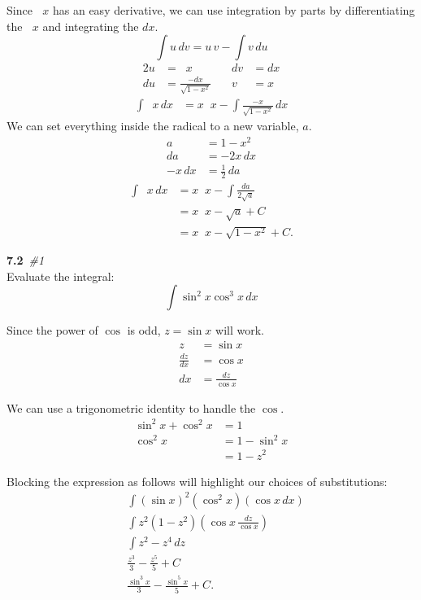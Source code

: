 \documentclass[10pt]{article}
\DeclareMathOperator{\invcos}{cos^{-1}}
\newcommand{\bfit}[2]{\textbf{#1}\ \textit{#2}}
\newcommand{\double}[0]{\par\null\par}
\renewcommand{\section}[2]{\double\LARGE\bfit{#1}{\##2}\normalsize\\}
\newcommand{\paren}[1]{\left({#1}\right)}
\let\xint\int
\renewcommand{\int}[2]{\xint{#1}\,d#2}
\begin{document}
Since $\invcos{x}$ has an easy derivative, we can use integration by parts by differentiating the $\invcos{x}$ and
integrating the $dx$.
%
\begin{equation*}
\int{u}{v}=u\,v-\int{v}{u}
\end{equation*}
%
\begin{alignat*}{2}
u&=\invcos{x} &\quad dv&=dx \\
du&=\frac{-dx}{\sqrt{1-x^2}} &\quad v&=x
\end{alignat*}
%
\begin{align*}
\int{\invcos{x}}{x}&=x\invcos{x}-\int{\frac{-x}{\sqrt{1-x^2}}}{x}
\end{align*}
%
We can set everything inside the radical to a new variable, $a$.
%
\begin{align*}
a&=1-x^2 \\
da&=-2x\,dx \\
-x\,dx&=\frac{1}{2}\,da
\end{align*}
%
\begin{align*}
\int{\invcos{x}}{x}&=x\invcos{x}-\xint{\frac{da}{2\sqrt{a}}} \\
&=x\invcos{x}-\sqrt{a}+C \\
&=x\invcos{x}-\sqrt{1-x^2}+C.
\end{align*}

\section{7.2}{1}
Evaluate the integral:
%
\begin{equation*}
\int{\sin^2{x}\cos^3{x}}{x}
\end{equation*}\double

Since the power of $\cos$ is odd, $z=\sin{x}$ will work.
%
\begin{align*}
z&=\sin{x} \\
\frac{dz}{dx}&=\cos{x} \\
dx&=\frac{dz}{\cos{x}}
\end{align*}

We can use a trigonometric identity to handle the $\cos$.
%
\begin{align*}
\sin^2{x}+\cos^2{x}&=1 \\
\cos^2{x}&=1-\sin^2{x} \\
&=1-z^2
\end{align*}

Blocking the expression as follows will highlight our choices of substitutions:
%
\begin{align*}
&\xint\paren{\sin{x}}^2\paren{\cos^2{x}}\paren{\cos{x}\,dx} \\
&\xint{z}^2\paren{1-z^2}\paren{\cos{x}\,\frac{dz}{\cos{x}}} \\
&\int{z^2-z^4}{z} \\
&\frac{z^3}{3}-\frac{z^5}{5}+C \\
&\frac{\sin^3{x}}{3}-\frac{\sin^5{x}}{5}+C.
\end{align*}
\end{document}
